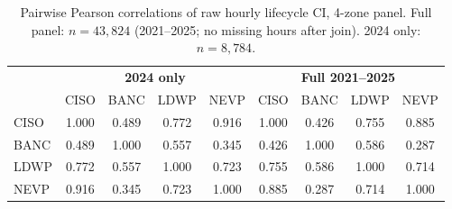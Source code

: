 \begin{table}[ht]
\centering
\small
\caption{Pairwise Pearson correlations of raw hourly lifecycle CI, 4-zone panel. Full panel: $n = 43{,}824$ (2021--2025; no missing hours after join). 2024 only: $n = 8{,}784$.}
\label{tab:corr}
\setlength{\tabcolsep}{5pt}
\begin{tabular}{lcccc|cccc}
\toprule
 & \multicolumn{4}{c|}{\textbf{2024 only}} & \multicolumn{4}{c}{\textbf{Full 2021--2025}} \\
 & CISO & BANC & LDWP & NEVP & CISO & BANC & LDWP & NEVP \\
\midrule
CISO & 1.000 & 0.489 & 0.772 & 0.916 & 1.000 & 0.426 & 0.755 & 0.885 \\
BANC & 0.489 & 1.000 & 0.557 & 0.345 & 0.426 & 1.000 & 0.586 & 0.287 \\
LDWP & 0.772 & 0.557 & 1.000 & 0.723 & 0.755 & 0.586 & 1.000 & 0.714 \\
NEVP & 0.916 & 0.345 & 0.723 & 1.000 & 0.885 & 0.287 & 0.714 & 1.000 \\
\bottomrule
\end{tabular}
\end{table}
